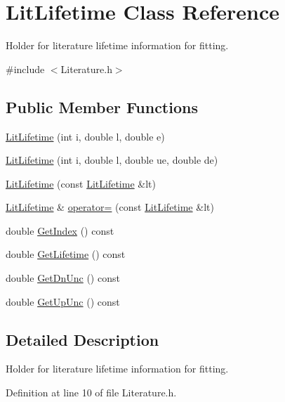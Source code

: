 \hypertarget{classLitLifetime}{\section{Lit\-Lifetime Class Reference}
\label{classLitLifetime}
}


Holder for literature lifetime information for fitting.  




{\ttfamily \#include $<$Literature.\-h$>$}

\subsection*{Public Member Functions}
\begin{DoxyCompactItemize}
\item 
\hyperlink{classLitLifetime_a461df27aca4153f0a7a11ea968c4f5ed}{Lit\-Lifetime} (int i, double l, double e)
\item 
\hyperlink{classLitLifetime_ad1cbc0e2f4146fc4b8149a223cd3774f}{Lit\-Lifetime} (int i, double l, double ue, double de)
\item 
\hyperlink{classLitLifetime_ab6452e2bbc9184de31298f570932ea84}{Lit\-Lifetime} (const \hyperlink{classLitLifetime}{Lit\-Lifetime} \&lt)
\item 
\hyperlink{classLitLifetime}{Lit\-Lifetime} \& \hyperlink{classLitLifetime_ac3320ac4c642ddab673b38b20fbadaa7}{operator=} (const \hyperlink{classLitLifetime}{Lit\-Lifetime} \&lt)
\item 
double \hyperlink{classLitLifetime_acd291195395d2e3526aa86e151831b4e}{Get\-Index} () const 
\item 
double \hyperlink{classLitLifetime_a3cd6a91b3d6168507b5c5d4bffe4fe20}{Get\-Lifetime} () const 
\item 
double \hyperlink{classLitLifetime_ae7429d976ab3dd9c37d5c5eee581d94e}{Get\-Dn\-Unc} () const 
\item 
double \hyperlink{classLitLifetime_a481f6762e4230fa67a05ce2a591f1088}{Get\-Up\-Unc} () const 
\end{DoxyCompactItemize}


\subsection{Detailed Description}
Holder for literature lifetime information for fitting. 

Definition at line 10 of file Literature.\-h.



